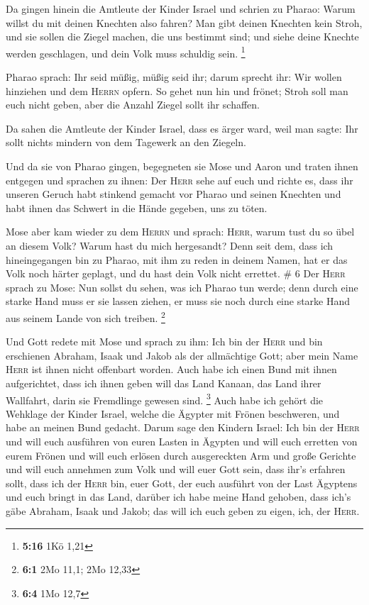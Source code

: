  Da gingen hinein die Amtleute der Kinder Israel und
schrien zu Pharao: Warum willst du mit deinen Knechten also fahren?
 Man gibt deinen Knechten kein Stroh, und sie sollen die
Ziegel machen, die uns bestimmt sind; und siehe deine Knechte werden
geschlagen, und dein Volk muss schuldig sein. \footnote{\textbf{5:16}
  1Kö 1,21}

 Pharao sprach: Ihr seid müßig, müßig seid ihr; darum
sprecht ihr: Wir wollen hinziehen und dem \textsc{Herrn} opfern.
 So gehet nun hin und frönet; Stroh soll man euch nicht
geben, aber die Anzahl Ziegel sollt ihr schaffen.

 Da sahen die Amtleute der Kinder Israel, dass es ärger
ward, weil man sagte: Ihr sollt nichts mindern von dem Tagewerk an den
Ziegeln.

 Und da sie von Pharao gingen, begegneten sie Mose und
Aaron und traten ihnen entgegen  und sprachen zu ihnen:
Der \textsc{Herr} sehe auf euch und richte es, dass ihr unseren Geruch
habt stinkend gemacht vor Pharao und seinen Knechten und habt ihnen das
Schwert in die Hände gegeben, uns zu töten.

 Mose aber kam wieder zu dem \textsc{Herrn} und sprach:
\textsc{Herr}, warum tust du so übel an diesem Volk? Warum hast du mich
hergesandt?  Denn seit dem, dass ich hineingegangen bin
zu Pharao, mit ihm zu reden in deinem Namen, hat er das Volk noch härter
geplagt, und du hast dein Volk nicht errettet. \# 6  Der
\textsc{Herr} sprach zu Mose: Nun sollst du sehen, was ich Pharao tun
werde; denn durch eine starke Hand muss er sie lassen ziehen, er muss
sie noch durch eine starke Hand aus seinem Lande von sich treiben.
\footnote{\textbf{6:1} 2Mo 11,1; 2Mo 12,33}

 Und Gott redete mit Mose und sprach zu ihm: Ich bin der
\textsc{Herr}  und bin erschienen Abraham, Isaak und Jakob
als der allmächtige Gott; aber mein Name \textsc{Herr} ist ihnen nicht
offenbart worden.  Auch habe ich einen Bund mit ihnen
aufgerichtet, dass ich ihnen geben will das Land Kanaan, das Land ihrer
Wallfahrt, darin sie Fremdlinge gewesen sind. \footnote{\textbf{6:4} 1Mo
  12,7}  Auch habe ich gehört die Wehklage der Kinder
Israel, welche die Ägypter mit Frönen beschweren, und habe an meinen
Bund gedacht.  Darum sage den Kindern Israel: Ich bin der
\textsc{Herr} und will euch ausführen von euren Lasten in Ägypten und
will euch erretten von eurem Frönen und will euch erlösen durch
ausgereckten Arm und große Gerichte  und will euch
annehmen zum Volk und will euer Gott sein, dass ihr's erfahren sollt,
dass ich der \textsc{Herr} bin, euer Gott, der euch ausführt von der
Last Ägyptens  und euch bringt in das Land, darüber ich
habe meine Hand gehoben, dass ich's gäbe Abraham, Isaak und Jakob; das
will ich euch geben zu eigen, ich, der \textsc{Herr}.

